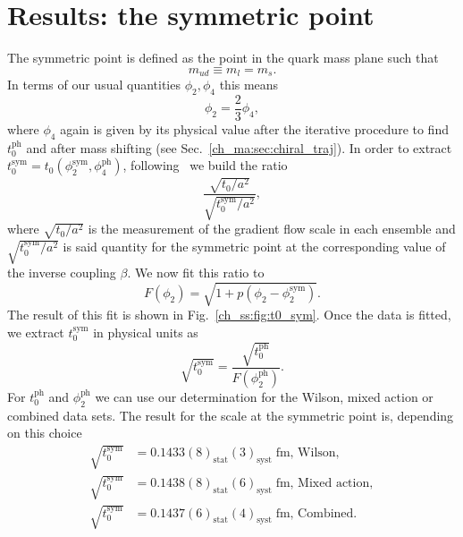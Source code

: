 \section{Results: the symmetric point}

The symmetric point is defined as the point in the quark mass plane such that
\begin{equation}
m_{ud}\equiv m_l=m_s.
\end{equation}
In terms of our usual quantities $\phi_2,\phi_4$ this means
\begin{equation}
\phi_2=\frac{2}{3}\phi_4,
\end{equation}
where $\phi_4$ again is given by its physical value after the iterative procedure to find $t_0^{\textrm{ph}}$ and after mass shifting (see Sec.~\ref{ch_ma:sec:chiral_traj}). In order to extract $t_0^{\textrm{sym}}=t_0(\phi_2^{\textrm{sym}},\phi_4^{\textrm{ph}})$, following~\citep{Strassberger:2023xnj} we build the ratio
\begin{equation}
\frac{\sqrt{t_0/a^2}}{\sqrt{t_0^{\textrm{sym}}/a^2}},
\end{equation}
where $\sqrt{t_0/a^2}$ is the measurement of the gradient flow scale in each ensemble and $\sqrt{t_0^{\textrm{sym}}/a^2}$ is said quantity for the symmetric point at the corresponding value of the inverse coupling $\beta$. We now fit this ratio to
\begin{equation}
\label{ch_ss:eq:fit_t0_sym}
F(\phi_2)=\sqrt{1+p(\phi_2-\phi_2^{\textrm{sym}})}.
\end{equation}
The result of this fit is shown in Fig.~\ref{ch_ss:fig:t0_sym}. Once the data is fitted, we extract $t_0^{\textrm{sym}}$ in physical units as
\begin{equation}
\sqrt{t_0^{\textrm{sym}}}=\frac{\sqrt{t_0^{\textrm{ph}}}}{F(\phi_2^{\textrm{ph}})}.
\end{equation}
For $t_0^{\textrm{ph}}$ and $\phi_2^{\textrm{ph}}$ we can use our determination for the Wilson, mixed action or combined data sets. The result for the scale at the symmetric point is, depending on this choice
\begin{align}
\label{ch_ss:eq:t0_sym}
\sqrt{t_0^{\textrm{sym}}}&=0.1433(8)_{\textrm{stat}}(3)_{\textrm{syst}}\;\textrm{fm, Wilson}, \\
\sqrt{t_0^{\textrm{sym}}}&=0.1438(8)_{\textrm{stat}}(6)_{\textrm{syst}}\;\textrm{fm, Mixed action}, \\
\sqrt{t_0^{\textrm{sym}}}&=0.1437(6)_{\textrm{stat}}(4)_{\textrm{syst}}\;\textrm{fm, Combined}.
\end{align}

